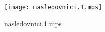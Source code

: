\documentclass[letterpaper,10pt]{article}
\begin{document}
\begin{figure}
    \centering
    \texttt{[image: nasledovnici.1.mps]}
    \caption{nasledovnici.1.mps}
\end{figure}
\end{document}
